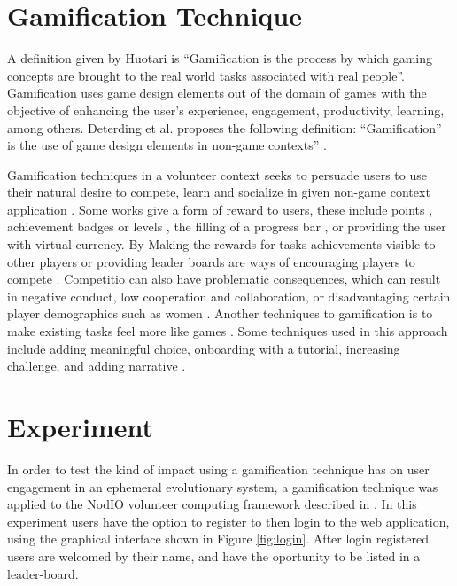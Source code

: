 \documentclass{llncs}
\begin{document}
\section{Gamification Technique}
\label{sec:experiments}
A definition given by Huotari  \cite{huotari2012defining} is ``Gamification is
the process by which gaming concepts are brought to the real world tasks associated with
real people''. Gamification uses game design elements out of the domain of games 
with the objective of enhancing the user's experience, engagement, productivity, 
learning, among others. Deterding et al. proposes the following definition:
 ``Gamification” is the use of game design elements in non-game contexts'' 
 \cite{deterding2011gamification}.

Gamification techniques in a volunteer context seeks to persuade 
users to use their natural desire to compete, learn and socialize in 
given non-game context application \cite{deterding2011game, hamari2014does}.  
Some works give a form of reward to users, these include 
points \cite{sutter2010browse}, achievement badges or levels \cite{hamari2011framework}, 
the filling of a progress bar \cite{o2010get}, or providing the user with virtual currency.
By Making the rewards for  tasks achievements visible to other players or 
providing leader boards are ways of encouraging players to compete \cite{hickman2010total}. 
Competitio can also have problematic consequences, which can result in
negative conduct, low cooperation and collaboration, or disadvantaging certain player demographics
such as women \cite{kumar2013gamification}. Another techniques to gamification 
is to make existing tasks feel more like games \cite{deterding2010just}. 
Some techniques used in this approach include adding meaningful choice, 
onboarding with a tutorial, increasing challenge, and adding narrative \cite{mcgonigal2011reality}.




\section{Experiment}
\label{sec:experiments}

In order to test the kind of impact using a gamification technique has on 
user engagement in an ephemeral evolutionary system, a gamification 
technique was applied to the {\sf NodIO} volunteer computing framework 
described in \cite{DBLP:conf/gecco/MereloCGCRV16,2016arXiv160101607M}.
In this experiment users have the option to register to then login to 
the web application, using the graphical interface shown in Figure \ref{fig:login}.
After login registered users are welcomed by their name, and have
the oportunity to be listed in a leader-board.         
\end{document}
